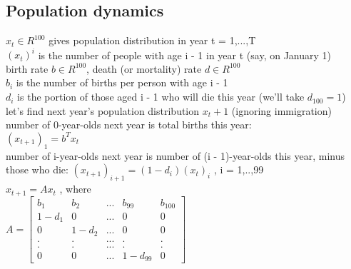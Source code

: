 \subsection{Population dynamics}
\textbullet $x_t \in R^{100}$ gives population distribution in year t = 1,...,T\\
\textbullet $(x_t)^i$ is the number of people with age i - 1 in year t (say, on January 1)\\
\textbullet birth rate $b \in R^{100}$, death (or mortality) rate $d \in R^{100}$\\
\textbullet $b_i$ is the number of births per person with age i - 1\\
\textbullet $d_i$ is the portion of those aged i - 1 who will die this year (we’ll take $d_{100} = 1$)
\textbullet let’s find next year’s population distribution $x_t+1$ (ignoring immigration)\\
\textbullet number of 0-year-olds next year is total births this year:\\
$(x_{t+1})_1 = b^Tx_t$\\
\textbullet number of i-year-olds next year is number of (i - 1)-year-olds this year, minus those who die:
$(x_{t+1})_{i+1} = (1 - d_i)(x_t)_i$ , i = 1,..,99\\
\textbullet $x_{t+1} = Ax_t$ , where\\
$A =
\begin{bmatrix}
    b_1 & b_2 &...& b_{99} & {b_{100}} \\
    1-d_1 & 0 &...& 0 & 0\\
    0 & 1-d_2 &...& 0 & 0\\
    . & . &...& . &.\\
    . & . &...& . &.\\
    0 & 0 &...& 1-d_{99} & 0
\end{bmatrix}
$
